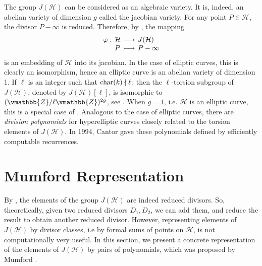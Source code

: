 \begin{remark}
The group $J(\mathcal{H})$ can be considered as an algebraic variety. It is, indeed, an abelian 
variety of dimension $g$ called the jacobian variety. For any point $P \in \mathcal{H}$, the divisor 
$P - \infty$ is reduced. Therefore, by , the mapping
$$
\setlength\arraycolsep{2pt}
\begin{array}{llll}
\varphi: & \mathcal{H} & \longrightarrow & J(\mathcal{H}) \\
 & P & \longmapsto & P - \infty
\end{array}
$$
is an embedding of $\mathcal{H}$ into its jacobian. In the case of elliptic curves, this is clearly 
an isomorphism, hence an elliptic curve is an abelian variety of dimension 1. If $\ell$ is an 
integer such that $\operatorname{char}(k) \nmid \ell$; then the $\ell$-torsion subgroup of $J(\mathcal{H})$, 
denoted by $J(\mathcal{H})[\ell]$, is isomorphic to $(\vmathbb{Z} / \ell\vmathbb{Z})^{2g}$, see 
\cite[ch. 4, 5]{Cohen2006}. When $g = 1$, i.e. $\mathcal{H}$ is an elliptic curve, this is a special 
case of . Analogous to the case of elliptic curves, there are 
\emph{division polynomials} for hyperelliptic curves closely related to the torsion elements of 
$J(\mathcal{H})$. In 1994, Cantor \cite{Cantor1994} gave these polynomials defined by efficiently 
computable recurrences.
\end{remark}










\section{Mumford Representation}

By , the elements of the group $J(\mathcal{H})$ are indeed reduced
divisors. So, theoretically, given two reduced divisors $D_1, D_2$, we can add them, and reduce the 
result to obtain another reduced divisor. However, representing elements of $J(\mathcal{H})$ by 
divisor classes, i.e by formal sums of points on $\mathcal{H}$, is not computationally very useful. 
In this section, we present a concrete representation of the elements of $J(\mathcal{H})$ by pairs 
of polynomials, which was proposed by Mumford \cite{Mumford1984}. 

